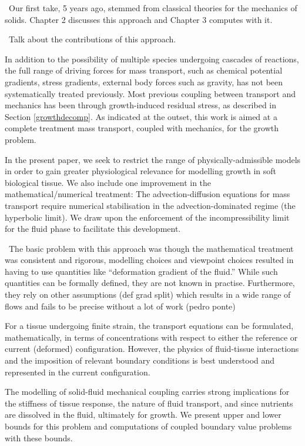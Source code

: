\textbullet\ Our first take, 5 years ago, stemmed from classical theories for
the mechanics of solids. Chapter 2 discusses this approach and Chapter
3 computes with it.

\textbullet\ Talk about the contributions of this approach.

In addition to the possibility of multiple species undergoing cascades
of reactions, the full range of driving forces for mass transport,
such as chemical potential gradients, stress gradients, external body
forces such as gravity, has not been systematically treated
previously. Most previous coupling between transport and mechanics has
been through growth-induced residual stress, as described in Section 
\ref{growthdecomp}. As indicated at the outset, this work is aimed at
a complete treatment mass transport, coupled with mechanics, for the
growth problem.

In the present paper, we seek to restrict the range of
physically-admissible models in order to gain greater
physiological relevance for modelling growth in soft biological
tissue. We also include one improvement in the mathematical/numerical treatment:
The advection-diffusion equations for mass transport
require numerical stabilisation in the advection-dominated regime
(the hyperbolic limit). We draw upon the enforcement of the
incompressibility limit for the fluid phase to facilitate this
development.

\textbullet\ 
 The basic problem with this approach was though the mathematical
treatment was consistent and rigorous, modelling choices and viewpoint
choices resulted in having to use quantities like ``deformation
gradient of the fluid.'' While such quantities can be formally
defined, they are not known in practise. Furthermore, they rely on
other assumptions (def grad split) which results in a wide range of
flows and fails to be precise without a lot of work (pedro ponte)

 For a tissue undergoing finite strain, the
  transport equations can be formulated, mathematically, in terms of
  concentrations with respect to either the reference or current
  (deformed) configuration. However, the physics of fluid-tissue
  interactions and the imposition of relevant boundary conditions is
  best understood and represented in the current configuration.

 The modelling of solid-fluid mechanical coupling
  carries strong implications for the stiffness of tissue response,
  the nature of fluid transport, and since nutrients are dissolved in
  the fluid, ultimately for growth. We present upper and lower bounds
  for this problem and computations of coupled boundary value problems with
  these bounds.

